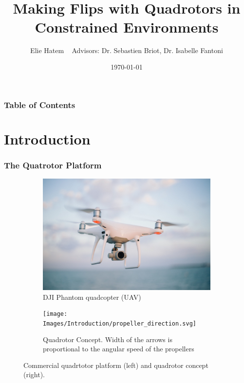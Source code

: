 \documentclass{thesisbeamer}
\title[Making Flips with Quadrotors in Constrained Environments]{Making Flips with Quadrotors in Constrained Environments}
\author[Elie Hatem]{Elie Hatem \newline ~ \newline \normalsize{Advisors: Dr. Sebastien Briot, Dr. Isabelle Fantoni}}
\date{\today}
\newcommand\Fontvi{\fontsize{9}{10}\selectfont}
\begin{document}
\MakeTitleNoFoot

\begin{frame}[allowframebreaks]
	\frametitle{Table of Contents}
     \tableofcontents
\end{frame}


\section{Introduction}

\begin{frame}
\frametitle{The Quatrotor Platform}
\Fontvi

\begin{figure}[t]
     \centering
     \begin{subfigure}[b]{0.45\textwidth}
         \centering
         \includegraphics[width=\textwidth]{Images/Introduction/drone}
         \caption[Caption for LOF]{DJI Phantom quadcopter (UAV)\protect\footnotemark}
         \label{fig:drone}
     \end{subfigure}
     \hfill
     \begin{subfigure}[b]{0.45\textwidth}
         \centering
         \texttt{[image: Images/Introduction/propeller\_direction.svg]}
         \caption{Quadrotor Concept. Width of the arrows is proportional to the angular speed of the propellers\protect\footnotemark}
         \label{fig:propeller_directions}
     \end{subfigure}
        \caption{Commercial quadrtotor platform (left) and quadrotor concept (right).}
        \label{fig:three graphs}
\end{figure}


\end{frame}
\end{document}
